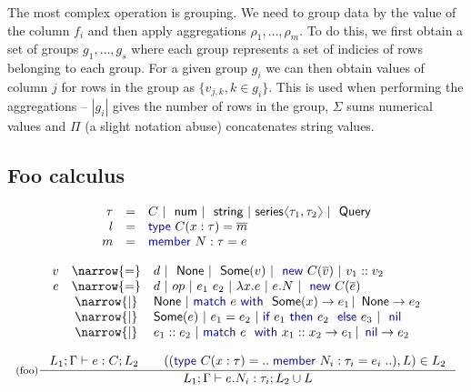 \documentclass[a4paper,UKenglish]{lipics-v2016}
\theoremstyle{plain}
\theoremstyle{definition}
\newcommand{\langl}{\begin{picture}(4.5,7)
\put(1.1,2.5){\rotatebox{60}{\line(1,0){5.5}}}
\put(1.1,2.5){\rotatebox{300}{\line(1,0){5.5}}}
\end{picture}}
\newcommand{\rangl}{\begin{picture}(4.5,7)
\put(.9,2.5){\rotatebox{120}{\line(1,0){5.5}}}
\put(.9,2.5){\rotatebox{240}{\line(1,0){5.5}}}
\end{picture}}
\newcommand{\lsep}{~|~}
\newcommand{\kvd}[1]{\textnormal{\textcolor{kvdclr}{\sffamily #1}}}
\newcommand{\ident}[1]{\textnormal{\sffamily #1}}
\begin{document}
The most complex operation is grouping. We need to group data by the value of the column $f_i$ and
then apply aggregations $\rho_1,\ldots,\rho_m$. To do this, we first obtain a set of groups $g_1,\ldots, g_s$
where each group represents a set of indicies of rows belonging to each group. For a given group 
$g_i$ we can then obtain values of column $j$ for rows in the group as $\{v_{j,k}, k\in g_i\}$.
This is used when performing the aggregations -- $|g_i|$ gives the number of rows in the group,
$\Sigma$ sums numerical values and $\Pi$ (a slight notation abuse) concatenates string values. 

\subsection{Foo calculus}
\label{sec:foo-foo}

\begin{equation*}
\begin{array}{rcl}
 \tau &=& C \lsep \ident{num} \lsep \ident{string} \lsep \ident{series}\langl \tau_1, \tau_2 \rangl \lsep \ident{Query}\\
 l &=& \kvd{type}~C(x:\tau) = \overline{m} \\[0.0em]
 m &=& \kvd{member}~N:\tau= e
\end{array}
\end{equation*}

\begin{equation*}
\begin{array}{rcl}
 v &\narrow{=}& d \lsep \ident{None} \lsep \ident{Some}(v) \lsep \kvd{new}~C(\overline{v}) \lsep v_1::v_2 \\[0.0em]
 e &\narrow{=}& d \lsep op \lsep e_1~e_2 \lsep \lambda x.e \lsep e.N \lsep \kvd{new}~C(\overline{e}) \\
   &\narrow{|}& \ident{None} \lsep\kvd{match}~e~\kvd{with}~\ident{Some}(x) \rightarrow e_1 \,|\, \ident{None} \rightarrow e_2 \\
   &\narrow{|}& \ident{Some}(e) \lsep e_1 = e_2 \lsep {\kvd{if}~e_1~\kvd{then}~e_2~\kvd{else}~e_3} \lsep \kvd{nil} \\
   &\narrow{|}& e_1 :: e_2 \lsep \kvd{match}~e~\kvd{with}~x_1::x_2 \rightarrow e_1 \,|\, \kvd{nil} \rightarrow e_2
\end{array}
\end{equation*}




\begin{equation*}
\inference[(foo)]
  {L_1; \Gamma \vdash e : C; L_2 \qquad ((\kvd{type}~C(x:\tau) = ..\;\kvd{member}~N_i : \tau_i = e_i\;..), L) \in L_2}
  {L_1; \Gamma \vdash e.N_i:\tau_i; L_2 \cup L}
\end{equation*}
\end{document}
